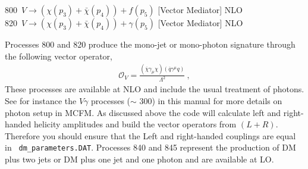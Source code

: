 
800~$ V\to({\chi}(p_3)+\bar{\chi}(p_4)) +f(p_5) $ [Vector Mediator]  NLO \\
820~$V\to({\chi}(p_3)+\bar{\chi}(p_4)) +\gamma(p_5)$ [Vector Mediator]  NLO

Processes 800 and 820 produce the 
mono-jet or mono-photon signature through the following vector operator, 
\begin{eqnarray}
\mathcal{O}_V=\frac{(\overline{\chi}\gamma_{\mu}\chi)(\overline{q}\gamma^{\mu}q)}{\Lambda^2}~,\label{eq:OV}  
\end{eqnarray}
These processes are available at NLO and include the usual treatment of photons. See for instance the $V\gamma$ 
processes ($\sim$ 300) in this 
manual for more details on photon setup in MCFM. As discussed above the code will calculate left and right-handed 
helicity amplitudes and build the 
vector operators from $(L+R)$. Therefore you should ensure that the Left and right-handed couplings are equal in  {\tt 
dm\_parameters.DAT}. 
Processes 840 and 845 represent the production of DM plus two jets or DM plus one jet and one photon and are available 
at LO. 
